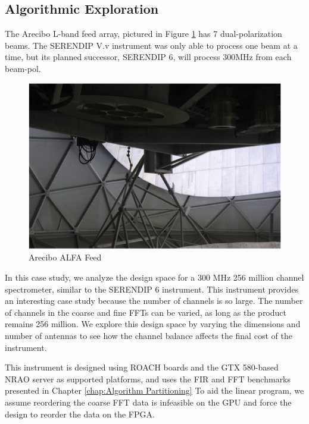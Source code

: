 
\subsection{Algorithmic Exploration}

The Arecibo L-band feed array, pictured in Figure \ref{fig: C3/alfa_feed.png} has 7 dual-polarization beams. 
The SERENDIP V.v instrument was only able to process one beam at a time, but its planned successor, SERENDIP 6, will process 300MHz from each beam-pol.

\begin{figure}[ht!]
  \centering
    \includegraphics[width=\textwidth]{Images/C3/alfa_feed.png}
  \caption{Arecibo ALFA Feed}
  \label{fig: C3/alfa_feed.png}
\end{figure}

In this case study, we analyze the design space for a 300 MHz 256 million channel spectrometer, similar to the SERENDIP 6 instrument.
This instrument provides an interesting case study because the number of channels is so large.
The number of channels in the coarse and fine FFTs can be varied, as long as the product remains 256 million.
We explore this design space by varying the dimensions and number of antennas to see how the channel balance affects the final cost of the instrument.

This instrument is designed using ROACH boards and the GTX 580-based NRAO server as supported platforms, and uses the FIR and FFT benchmarks presented in Chapter \ref{chap:Algorithm Partitioning}
To aid the linear program, we assume reordering the coarse FFT data is infeasible on the GPU and force the design to reorder the data on the FPGA.


